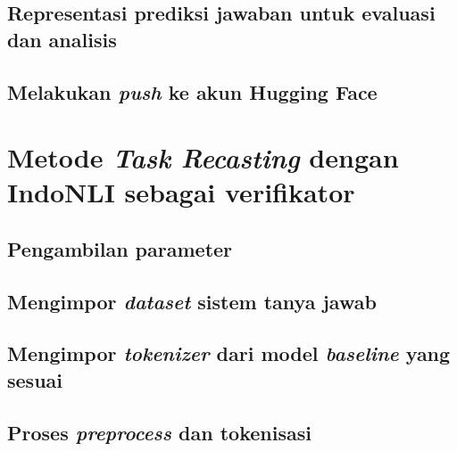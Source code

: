 \subsection{Representasi prediksi jawaban untuk evaluasi dan analisis}

\subsection{Melakukan \emph{push} ke akun Hugging Face}

\section{Metode \emph{Task Recasting} dengan IndoNLI sebagai verifikator}
\subsection{Pengambilan parameter}

\subsection{Mengimpor \emph{dataset} sistem tanya jawab}

\subsection{Mengimpor \emph{tokenizer} dari model \emph{baseline} yang sesuai}

\subsection{Proses \emph{preprocess} dan tokenisasi}

